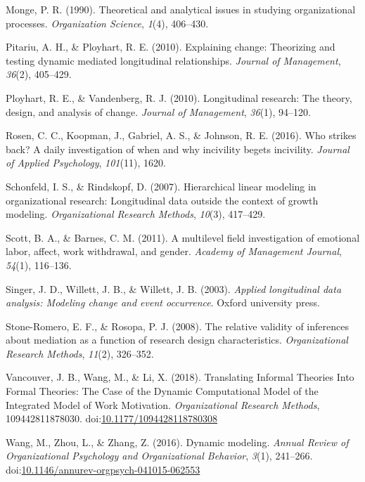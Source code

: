 \documentclass[english,,man]{apa6}
\theoremstyle{definition}
\theoremstyle{definition}
\theoremstyle{definition}
\theoremstyle{remark}
\begin{document}
\leavevmode\hypertarget{ref-monge_theoretical_1990}{}%
Monge, P. R. (1990). Theoretical and analytical issues in studying
organizational processes. \emph{Organization Science}, \emph{1}(4),
406--430.

\leavevmode\hypertarget{ref-pitariu_explaining_2010}{}%
Pitariu, A. H., \& Ployhart, R. E. (2010). Explaining change: Theorizing
and testing dynamic mediated longitudinal relationships. \emph{Journal
of Management}, \emph{36}(2), 405--429.

\leavevmode\hypertarget{ref-ployhart_longitudinal_2010}{}%
Ployhart, R. E., \& Vandenberg, R. J. (2010). Longitudinal research: The
theory, design, and analysis of change. \emph{Journal of Management},
\emph{36}(1), 94--120.

\leavevmode\hypertarget{ref-rosen_who_2016}{}%
Rosen, C. C., Koopman, J., Gabriel, A. S., \& Johnson, R. E. (2016). Who
strikes back? A daily investigation of when and why incivility begets
incivility. \emph{Journal of Applied Psychology}, \emph{101}(11), 1620.

\leavevmode\hypertarget{ref-schonfeld2007hierarchical}{}%
Schonfeld, I. S., \& Rindskopf, D. (2007). Hierarchical linear modeling
in organizational research: Longitudinal data outside the context of
growth modeling. \emph{Organizational Research Methods}, \emph{10}(3),
417--429.

\leavevmode\hypertarget{ref-scott_multilevel_2011}{}%
Scott, B. A., \& Barnes, C. M. (2011). A multilevel field investigation
of emotional labor, affect, work withdrawal, and gender. \emph{Academy
of Management Journal}, \emph{54}(1), 116--136.

\leavevmode\hypertarget{ref-singer_applied_2003}{}%
Singer, J. D., Willett, J. B., \& Willett, J. B. (2003). \emph{Applied
longitudinal data analysis: Modeling change and event occurrence}.
Oxford university press.

\leavevmode\hypertarget{ref-stone2008relative}{}%
Stone-Romero, E. F., \& Rosopa, P. J. (2008). The relative validity of
inferences about mediation as a function of research design
characteristics. \emph{Organizational Research Methods}, \emph{11}(2),
326--352.

\leavevmode\hypertarget{ref-vancouver_translating_2018}{}%
Vancouver, J. B., Wang, M., \& Li, X. (2018). Translating Informal
Theories Into Formal Theories: The Case of the Dynamic Computational
Model of the Integrated Model of Work Motivation. \emph{Organizational
Research Methods}, 109442811878030.
doi:\href{https://doi.org/10.1177/1094428118780308}{10.1177/1094428118780308}

\leavevmode\hypertarget{ref-Wang2016}{}%
Wang, M., Zhou, L., \& Zhang, Z. (2016). Dynamic modeling. \emph{Annual
Review of Organizational Psychology and Organizational Behavior},
\emph{3}(1), 241--266.
doi:\href{https://doi.org/10.1146/annurev-orgpsych-041015-062553}{10.1146/annurev-orgpsych-041015-062553}
\end{document}
